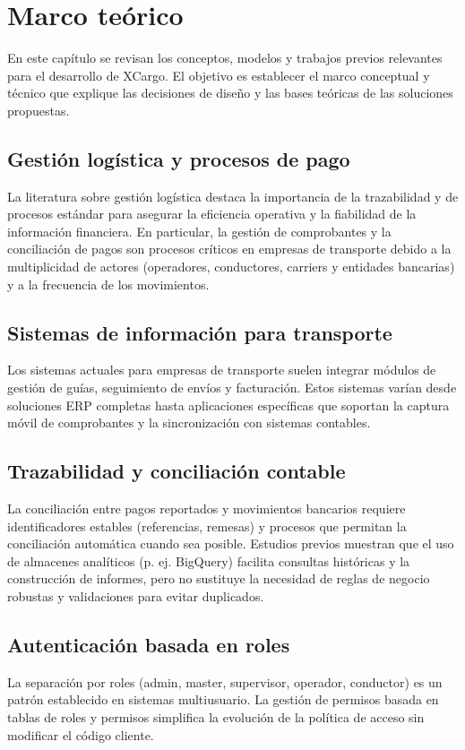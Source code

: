 \chapter{Marco teórico}

En este capítulo se revisan los conceptos, modelos y trabajos previos relevantes para el desarrollo de XCargo. El objetivo es establecer el marco conceptual y técnico que explique las decisiones de diseño y las bases teóricas de las soluciones propuestas.

\section{Gestión logística y procesos de pago}
La literatura sobre gestión logística destaca la importancia de la trazabilidad y de procesos estándar para asegurar la eficiencia operativa y la fiabilidad de la información financiera. En particular, la gestión de comprobantes y la conciliación de pagos son procesos críticos en empresas de transporte debido a la multiplicidad de actores (operadores, conductores, carriers y entidades bancarias) y a la frecuencia de los movimientos.
\cite{react2013, bigquery2011}

\section{Sistemas de información para transporte}
Los sistemas actuales para empresas de transporte suelen integrar módulos de gestión de guías, seguimiento de envíos y facturación. Estos sistemas varían desde soluciones ERP completas hasta aplicaciones específicas que soportan la captura móvil de comprobantes y la sincronización con sistemas contables.

\section{Trazabilidad y conciliación contable}
La conciliación entre pagos reportados y movimientos bancarios requiere identificadores estables (referencias, remesas) y procesos que permitan la conciliación automática cuando sea posible. Estudios previos muestran que el uso de almacenes analíticos (p. ej. BigQuery) facilita consultas históricas y la construcción de informes, pero no sustituye la necesidad de reglas de negocio robustas y validaciones para evitar duplicados.
\cite{bigquery2011, uuid2005}

\section{Autenticación basada en roles}
La separación por roles (admin, master, supervisor, operador, conductor) es un patrón establecido en sistemas multiusuario. La gestión de permisos basada en tablas de roles y permisos simplifica la evolución de la política de acceso sin modificar el código cliente.
\cite{jwt2015}

